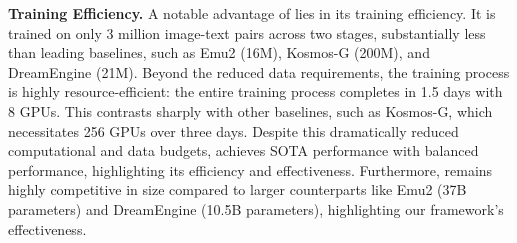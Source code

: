\textbf{Training Efficiency.}
A notable advantage of \model lies in its training efficiency. It is trained on only 3 million image-text pairs across two stages, substantially less than leading baselines, such as Emu2 (16M), Kosmos-G (200M), and DreamEngine (21M).
Beyond the reduced data requirements, the training process is highly resource-efficient: the entire training process completes in 1.5 days with 8 GPUs. This contrasts sharply with other baselines, such as Kosmos-G, which necessitates 256 GPUs over three days.
Despite this dramatically reduced computational and data budgets, \model achieves SOTA performance with balanced performance, highlighting its efficiency and effectiveness.
Furthermore, \model remains highly competitive in size compared to larger counterparts like Emu2 (37B parameters) and DreamEngine (10.5B parameters), highlighting our framework's effectiveness.



% 

